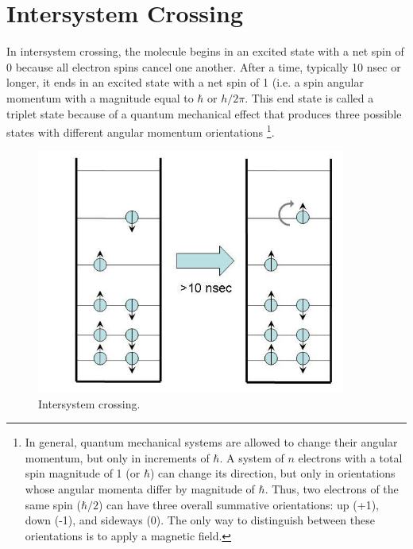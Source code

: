 \section{Intersystem Crossing}

In intersystem crossing, the molecule begins in an excited state with a net spin of 0 because all electron spins cancel one another. After a time, typically 10 nsec or longer, it ends in an excited state with a net spin of 1 (i.e. a spin angular momentum with a magnitude equal to $\hbar$ or $h/2\pi$.  This end state is called a triplet state because of a quantum mechanical effect that produces three possible states with different angular momentum orientations \footnote[3]{In general, quantum mechanical systems are allowed to change their angular momentum, but only in increments of $\hbar$. A system of $n$ electrons with a total spin magnitude of 1 (or $\hbar$) can change its direction, but only in orientations whose angular momenta differ by magnitude of $\hbar$. Thus, two electrons of the same spin ($\hbar/2$) can have three overall summative orientations: up (+1), down (-1), and sideways (0).  The only way to distinguish between these orientations is to apply a magnetic field.}.
\begin{figure}[h]
	\centering
	\includegraphics[width=4.0in]{./figures/Topic7/Fig7-4.jpg}
	\caption{Intersystem crossing.}
	\label{Fig7-4}
\end{figure}

